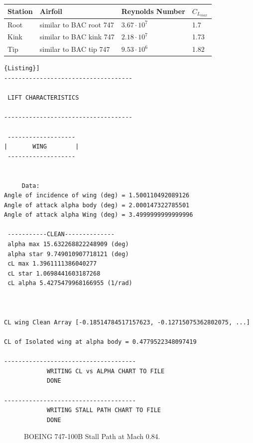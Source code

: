 \begin{center}
	\begin{tabular}{ | l | l | l | l |}
		\hline
		Station & Airfoil & Reynolds Number & $C_{L_{max}}$ \\ \hline
		Root & similar to BAC root 747 & $3.67 \cdot 10^7$ & 1.7 \\ \hline
		Kink & similar to BAC kink 747 &  $2.18 \cdot 10^7$ & 1.73 \\ \hline
		Tip & similar to BAC tip 747 & $9.53 \cdot 10^6$ & 1.82 \\
		\hline
	\end{tabular}
\end{center}



\begin{lstlisting}[caption={{\footnotesize Lift Characteristics of a Lifting Surface - Results. BOEING 747-100B for M=0.84}},label= [style=\bfseries]{Listing}]
------------------------------------

 LIFT CHARACTERISTICS  

------------------------------------

 ------------------- 
|       WING        |
 ------------------- 


	 Data: 
Angle of incidence of wing (deg) = 1.500110492089126
Angle of attack alpha body (deg) = 2.000147322785501
Angle of attack alpha Wing (deg) = 3.4999999999999996

 -----------CLEAN-------------- 
 alpha max 15.632268822248909 (deg)
 alpha star 9.749010907718121 (deg)
 cL max 1.3961111386040277
 cL star 1.0698441603187268
 cL alpha 5.4275479968166955 (1/rad)



CL wing Clean Array [-0.18514784517157623, -0.12715075362802075, ...]

CL of Isolated wing at alpha body = 0.4779522348097419

-------------------------------------
	 	 	WRITING CL vs ALPHA CHART TO FILE  
	 	 	DONE  

-------------------------------------
	 	 	WRITING STALL PATH CHART TO FILE  
	 	 	DONE  

\end{lstlisting}


\begin{figure}[H]
\centering

\caption{BOEING 747-100B Stall Path at Mach 0.84.}
\label{fig:stallB}
\end{figure}


